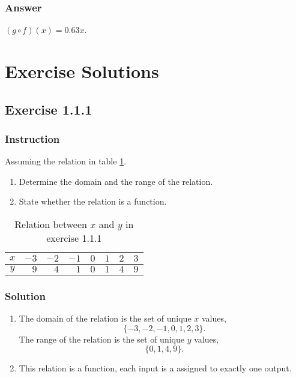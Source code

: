 \documentclass[11pt, letterpaper, oneside]{memoir}
\begin{document}
\subsubsection{Answer}

$ (g \circ f)(x) = 0.63x $.

\section*{Exercise Solutions}

\subsection*{Exercise 1.1.1}

\subsubsection{Instruction}

Assuming the relation in table \ref{table:exercise-1.1.1}.
\begin{enumerate}[label=(\alph*)]
  \item Determine the domain and the range of the relation.
  \item State whether the relation is a function.
\end{enumerate}

\begin{table}[ht]
  \centering
  \begin{tabular}{ c | r r r r r r r }
    \hline
    $ x $ & $ -3 $ & $ -2 $ & $ -1 $ & $ 0 $ & $ 1 $ & $ 2 $ & $ 3 $ \\
    \hline
    $ y $ & $ 9 $ & $ 4 $ & $ 1 $ & $ 0 $ & $ 1 $ & $ 4 $ & $ 9 $ \\
    \hline
  \end{tabular}
  \caption{Relation between $ x $ and $ y $ in exercise 1.1.1}
  \label{table:exercise-1.1.1}
\end{table}

\subsubsection{Solution}

\begin{enumerate}[label=(\alph*)]
  \item The domain of the relation is the set of unique $ x $ values,
    $$ \phantom{.}
    \{ -3, -2, -1, 0, 1, 2, 3 \}
    .$$
    The range of the relation is the set of unique $ y $ values,
    $$ \phantom{.}
    \{ 0, 1, 4, 9 \}
    .$$
  \item This relation is a function, each input is a assigned to exactly one output.
\end{enumerate}
\end{document}
